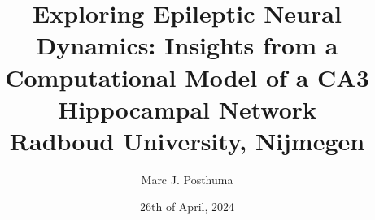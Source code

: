 \documentclass[12pt]{report}
\title{
    {Exploring Epileptic Neural Dynamics: Insights from a Computational Model of a CA3 Hippocampal Network}\\
    {\large Radboud University, Nijmegen}\\
}
\author{Marc J. Posthuma}
\date{26th of April, 2024}
\begin{document}
\listoftodos%

\maketitle

\tableofcontents
\listoffigures
\listoftables





\appendix


\printbibliography%
\end{document}
